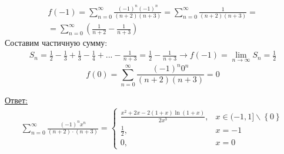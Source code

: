 \documentclass[a5paper, 10pt]{article}
\theoremstyle{definition}
\theoremstyle{plain}
\theoremstyle{remark}
\begin{document}
\begin{multline*}
f(-1) = \sum  \limits_{n = 0}^{\infty}  \frac{ (-1)^n (-1)^{n}}{(n+ 2) (n+ 3)}
 = \sum  \limits_{n = 0}^{\infty}  \frac{1}{(n+ 2)(n+ 3)}=\\
= \sum  \limits_{n = 0}^{\infty} \left(  \frac{1}{n+ 2} -  \frac{1}{n+ 3} \right) 
\end{multline*}
Составим частичную сумму:
\begin{multline*}
 S_n = \frac{1}{2} -  \frac{1}{3} +\frac{1}{3} -  \frac{1}{4} +... - \frac{1}{n+ 3} =  \frac{1}{2} - \frac{1}{n+ 3} \to 
f(-1) = \lim_{n \to \infty} S_n = \frac{1}{2}
\end{multline*}
\begin{equation*}
f(0) = \sum  \limits_{n = 0}^{\infty}  \frac{ (-1)^n 0^{n}}{(n+ 2) (n+ 3)}
 = 0
\end{equation*}


\underline{Ответ:}  \begin{multline*}
\sum  \limits_{n = 0}^{\infty} \frac{(-1)^n x^n}{(n+ 2) \cdot(n+ 3)} = 
 \begin{cases}
   \frac{ x^2 + 2x -2(1+x) \ln(1+x)}{2x^3}, & x \in (-1, 1] \backslash \left\{0 \right\}\\
   \frac{1}{2}, & x = -1\\
     0, & x = 0
 \end{cases}
\end{multline*}
\end{document}
